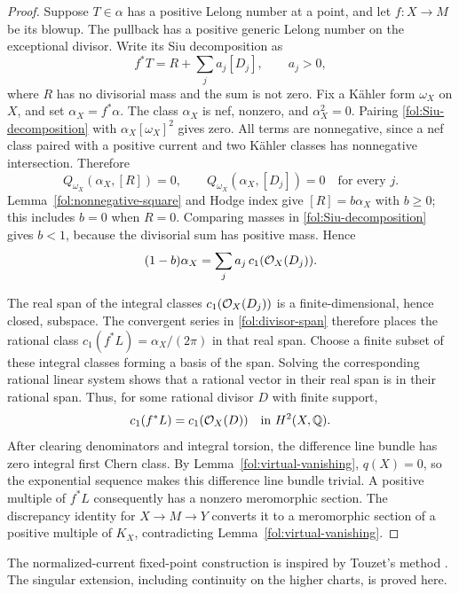 \begin{proof}
Suppose $T\in\alpha$ has a positive Lelong number at a point, and let
$f\colon X\to M$ be its blowup.  The pullback has a positive generic
Lelong number on the exceptional divisor.  Write its Siu decomposition
as
\begin{equation}\label{fol:Siu-decomposition}
 f^*T=R+\sum_j a_j[D_j],
 \qquad a_j>0,
\end{equation}
where $R$ has no divisorial mass and the sum is not zero.
Fix a K\"ahler form $\omega_X$ on $X$, and set $\alpha_X=f^*\alpha$.
The class $\alpha_X$ is nef, nonzero, and
$\alpha_X^2=0$.  Pairing \eqref{fol:Siu-decomposition} with
$\alpha_X[\omega_X]^2$ gives zero.  All terms are nonnegative,
since a nef class paired with a positive current and two K\"ahler
classes has nonnegative intersection.  Therefore
\[
 Q_{\omega_X}(\alpha_X,[R])=0,\qquad
 Q_{\omega_X}(\alpha_X,[D_j])=0
 \quad\text{for every }j.
\]
Lemma~\ref{fol:nonnegative-square} and Hodge index give
$[R]=b\alpha_X$ with $b\geq0$; this includes $b=0$ when $R=0$.
Comparing masses in \eqref{fol:Siu-decomposition} gives $b<1$,
because the divisorial sum has positive mass.  Hence
\begin{equation}\label{fol:divisor-span}
 (1-b)\alpha_X=\sum_j a_j\,c_1(\mathcal{O}_X(D_j)).
\end{equation}

The real span of the integral classes $c_1(\mathcal{O}_X(D_j))$ is a
finite-dimensional, hence closed, subspace.  The convergent series in
\eqref{fol:divisor-span} therefore places the rational class
$c_1(f^*L)=\alpha_X/(2\pi)$ in that real span.  Choose a finite subset
of these integral classes forming a basis of the span.  Solving the
corresponding rational linear system shows that a rational vector in
their real span is in their rational span.  Thus, for some rational
divisor $D$ with finite support,
\[
 c_1(f^*L)=c_1(\mathcal{O}_X(D))
 \quad\text{in }H^2(X,\mathbb{Q}).
\]
After clearing denominators and integral torsion, the difference line
bundle has zero integral first Chern class.  By
Lemma~\ref{fol:virtual-vanishing}, $q(X)=0$, so the exponential sequence
makes this difference line bundle trivial.  A positive multiple of
$f^*L$ consequently has a nonzero meromorphic section.  The discrepancy
identity for $X\to M\to Y$ converts it to a meromorphic section of a
positive multiple of $K_X$, contradicting
Lemma~\ref{fol:virtual-vanishing}.
\end{proof}

The normalized-current fixed-point construction is inspired by Touzet's
method \cite{Touzet2014}.  The singular extension, including continuity
on the higher charts, is proved here.

